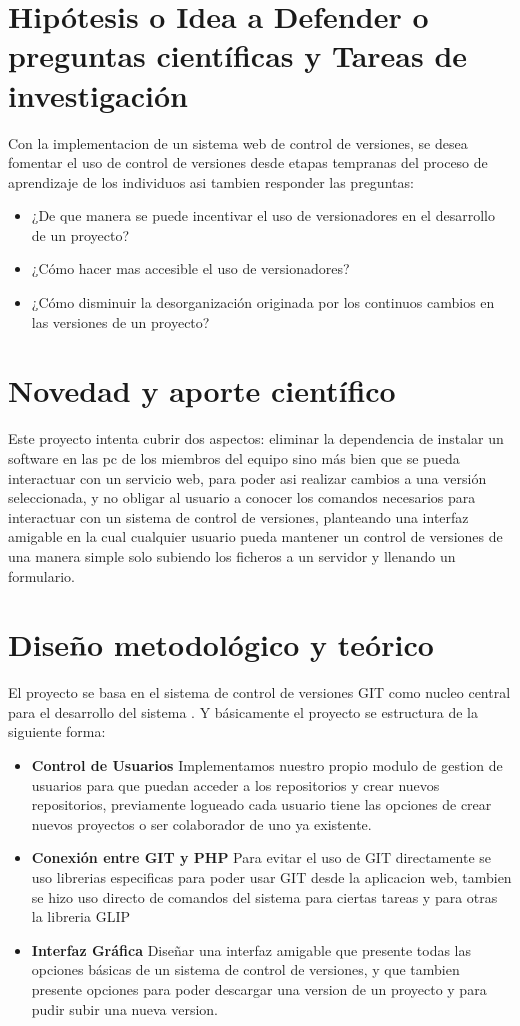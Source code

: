 \documentclass[letterpaper,11pt]{article}
\begin{document}
\section{Hipótesis o Idea a Defender o preguntas científicas y Tareas de investigación}
Con la implementacion de un sistema web de control de versiones, se desea fomentar el uso de control de versiones desde etapas tempranas del proceso de aprendizaje de los individuos asi tambien responder las preguntas:
\begin{itemize}
\item ¿De que manera se puede incentivar el uso de versionadores en el desarrollo de un proyecto?
\item ¿Cómo hacer mas accesible el uso de versionadores?
\item ¿Cómo disminuir la desorganización originada por los continuos cambios en las versiones de un proyecto?
\end{itemize}
\section{Novedad y aporte científico}
Este proyecto intenta cubrir dos aspectos: eliminar la dependencia de instalar un software en las pc de los miembros del equipo sino más bien que se pueda interactuar con un servicio web, para poder asi realizar cambios a una versión seleccionada, y no obligar al usuario a conocer los comandos necesarios para interactuar con un sistema de control de versiones, planteando una interfaz amigable en la cual cualquier usuario pueda mantener un control de versiones de una manera simple solo subiendo los ficheros a un servidor y llenando un formulario.

\section{Diseño metodológico y teórico}
El proyecto se basa en el sistema de control de versiones GIT como nucleo central para el desarrollo del sistema . Y básicamente el proyecto se estructura de la siguiente forma:
\begin{itemize}
\item{\bf Control de Usuarios}
Implementamos nuestro propio modulo de gestion de usuarios para que puedan acceder a los repositorios y crear nuevos repositorios, previamente logueado cada usuario tiene las opciones de crear nuevos proyectos o ser colaborador de uno ya existente.
\item{\bf Conexión entre GIT y PHP} Para evitar el uso de GIT directamente se uso librerias especificas para poder usar GIT desde la aplicacion web, tambien se hizo uso directo de comandos del sistema para ciertas tareas y para otras la libreria GLIP
\item{\bf Interfaz Gráfica}
Diseñar una interfaz amigable que presente todas las opciones básicas
de un sistema de control de versiones, y que tambien presente opciones para poder descargar una version de un proyecto
y para pudir subir una nueva version.
\end{itemize}
\end{document}
